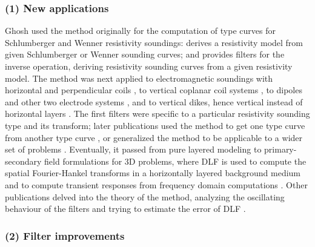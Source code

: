 \documentclass[paper,twocolumn,twoside]{geophysics}
\begin{document}
\subsubsection{(1) New applications}

Ghosh used the method originally for the computation of type curves for
Schlumberger and Wenner resistivity soundings: \cite{GP.71.Ghosh} derives a
resistivity model from given Schlumberger or Wenner sounding curves; and
\citet{GP.71.Ghoshb} provides filters for the inverse operation, deriving
resistivity sounding curves from a given resistivity model. The method was next
applied to electromagnetic soundings with horizontal and perpendicular coils
\citep{GP.72.Koefoed}, to vertical coplanar coil systems \citep{GP.73.Verma},
to dipoles and other two electrode systems \citep{GP.74.Das, GP.74.Dasb,
GP.80.Das, GEO.94.Sorensen}, and to vertical dikes, hence vertical instead of
horizontal layers \citep{GEO.75.Niwas}. The first filters were specific to a
particular resistivity sounding type and its transform; later publications used
the method to get one type curve from another type curve \citep{GP.77.Kumar,
GP.78.Kumar}, or generalized the method to be applicable to a wider set of
problems \citep{EXG.80.Davis, GXP.81.Das, GEO.84.Das, GP.84.ONeill}.
Eventually, it passed from pure layered modeling to primary-secondary field
formulations for 3D problems, where DLF is used to compute the spatial
Fourier-Hankel transforms in a horizontally layered background medium and to
compute transient responses from frequency domain computations
\citep{GJI.81.Das, GJI.82.Das, GEO.84.Anderson, GEO.86.Newman,
MGS.17.Kruglyakov}. Other publications delved into the theory of the method,
analyzing the oscillating behaviour of the filters and trying to estimate the
error of DLF \citep{GP.72.Koefoedb, GP.76.Koefoedb, GP.79.Johansen,
GP.90.Christensen}.

\subsubsection{(2) Filter improvements}
\end{document}
